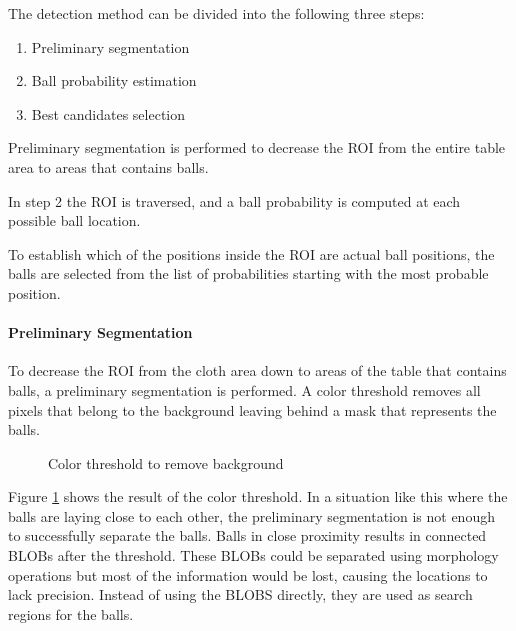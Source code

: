 The detection method can be divided into the following three steps:
\begin{enumerate}
  \item Preliminary segmentation
  \item Ball probability estimation
  \item Best candidates selection
\end{enumerate}

Preliminary segmentation is performed to decrease the ROI from the entire table area to areas that contains balls.

In step 2 the ROI is traversed, and a ball probability is computed at each possible ball location. 

To establish which of the positions inside the ROI are actual ball positions, the balls are selected from the list of probabilities starting with the most probable position.

\paragraph{Preliminary Segmentation}
To decrease the ROI from the cloth area down to areas of the table that contains balls, a preliminary segmentation is performed. A color threshold removes all pixels that belong to the background leaving behind a mask that represents the balls.
\begin{figure}[H]
  \centering
  \quad           
   \caption{Color threshold to remove background}
  \label{fig:thres1}
\end{figure}
Figure \ref{fig:thres1} shows the result of the color threshold. In a situation like this where the balls are laying close to each other, the preliminary segmentation is not enough to successfully separate the balls. Balls in close proximity results in connected BLOBs after the threshold. These BLOBs could be separated using morphology operations but most of the information would be lost, causing the locations to lack precision. Instead of using the BLOBS directly, they are used as search regions for the balls.

